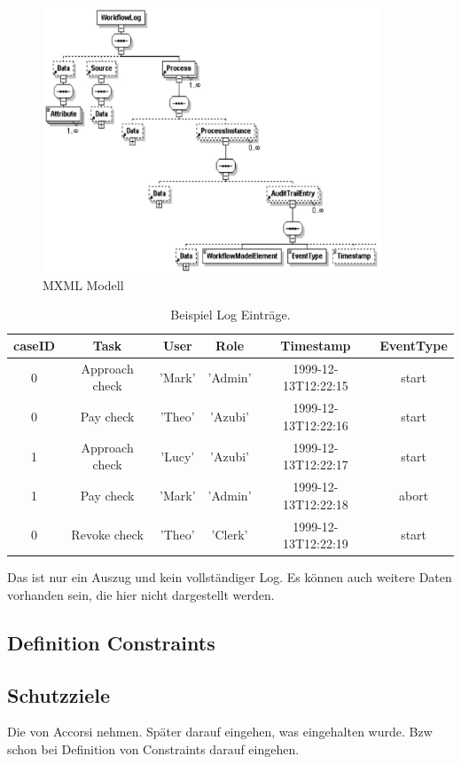 \begin{figure}[ht]
	\centering
  \includegraphics[width=0.9\textwidth]{"Figures/mxml"}
	\caption{MXML Modell}
	\label{fig:mxml}
\end{figure}


\begin{table}[h]
  \centering
  \begin{tabular}{|c|c|c|c|c|c|}
  caseID & Task & User & Role & Timestamp & EventType\\
  \hline
  0 & Approach check &'Mark' &'Admin' &1999-12-13T12:22:15 & start\\
  0 & Pay check & 'Theo' &'Azubi' &1999-12-13T12:22:16 & start\\
  1 & Approach check &'Lucy' & 'Azubi' &1999-12-13T12:22:17 &start\\
  1 & Pay check &'Mark' & 'Admin' &1999-12-13T12:22:18 & abort\\
  0 & Revoke check & 'Theo' & 'Clerk' & 1999-12-13T12:22:19 & start
  \end{tabular}
Das ist nur ein Auszug und kein vollständiger Log. Es können auch weitere Daten vorhanden sein, die hier nicht dargestellt werden.
  \caption{Beispiel Log Einträge. }
  \label{tab:examplelog}
\end{table}


\subsection{Definition Constraints}

\subsection{Schutzziele}
Die von Accorsi nehmen. Später darauf eingehen, was eingehalten wurde. Bzw schon bei Definition von Constraints darauf eingehen.





